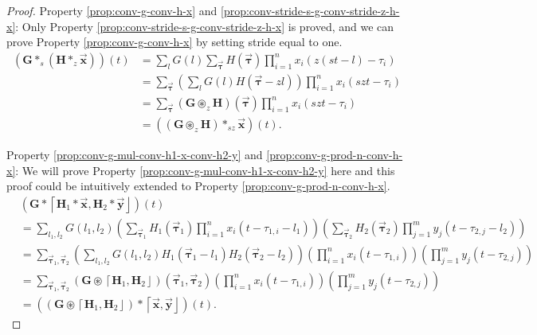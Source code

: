 \documentclass[twoside,11pt]{article}
\def\oconv{\circledast}
\def\tvar#1{\mathbf{#1}} %
\def\vsymb#1{\vec{\mathbf{#1}}}
\def\lcerfl#1{\left\lceil{#1}\right\rfloor}
\begin{document}
\begin{proof}
  Property \ref{prop:conv-g-conv-h-x} and \ref{prop:conv-stride-s-g-conv-stride-z-h-x}: Only Property \ref{prop:conv-stride-s-g-conv-stride-z-h-x} is proved, and we can prove Property \ref{prop:conv-g-conv-h-x} by setting stride equal to one.
  \begin{equation*}
    \begin{aligned}
      \left(\tvar{G} *_s (\tvar{H} *_z \vsymb{x})\right)(t)
       & = \sum_{l} G(l) \sum_{\vsymb{\tau}} H(\vsymb{\tau}) \prod_{i=1}^{n} x_i( z (s t - l) - \tau_i)              \\
       & = \sum_{\vsymb{\tau}} \left( \sum_{l} G(l) H(\vsymb{\tau} - z l) \right) \prod_{i=1}^{n} x_i(sz t - \tau_i) \\
       & = \sum_{\vsymb{\tau}} (\tvar{G} \oconv_z \tvar{H})(\vsymb{\tau}) \prod_{i=1}^{n} x_i(s z t - \tau_i)        \\
       & = \left((\tvar{G} \oconv_z \tvar{H}) *_{sz} \vsymb{x}\right)(t).
    \end{aligned}
  \end{equation*}

  Property \ref{prop:conv-g-mul-conv-h1-x-conv-h2-y} and \ref{prop:conv-g-prod-n-conv-h-x}: %
  We will prove Property \ref{prop:conv-g-mul-conv-h1-x-conv-h2-y} here and this proof could be intuitively extended to Property \ref{prop:conv-g-prod-n-conv-h-x}.
  \begin{equation*}
    \begin{aligned}
       & \left(\tvar{G} * \lcerfl{\tvar{H}_1 * \vsymb{x}, \tvar{H}_2 * \vsymb{y}}\right)(t)                   \\
       & = \sum_{l_1,l_2} G(l_1, l_2)
      \left( \sum_{\vsymb{\tau}_1} H_1(\vsymb{\tau}_1) \prod_{i=1}^{n} x_i(t - \tau_{1,i} - l_1) \right)
      \left( \sum_{\vsymb{\tau}_2} H_2(\vsymb{\tau}_2) \prod_{j=1}^{m} y_j(t - \tau_{2,j} - l_2) \right)      \\
       & = \sum_{\vsymb{\tau}_1, \vsymb{\tau}_2} \left( \sum_{l_1, l_2}
      G(l_1, l_2) H_1(\vsymb{\tau}_1 - l_1) H_2(\vsymb{\tau}_2 - l_2)
      \right)
      \left(\prod_{i=1}^{n} x_i(t - \tau_{1,i})\right) \left(\prod_{j=1}^{m} y_j(t - \tau_{2,j})\right)       \\
       & = \sum_{\vsymb{\tau}_1, \vsymb{\tau}_2}
      (\tvar{G} \oconv \lcerfl{\tvar{H}_1, \tvar{H}_2})(\vsymb{\tau}_1, \vsymb{\tau}_2)
      \left(\prod_{i=1}^{n} x_i(t - \tau_{1,i})\right) \left(\prod_{j=1}^{m} y_j(t - \tau_{2,j})\right)       \\
       & = \left((\tvar{G} \oconv \lcerfl{\tvar{H}_1, \tvar{H}_2}) * \lcerfl{\vsymb{x}, \vsymb{y}}\right)(t).
    \end{aligned}
  \end{equation*}


\end{proof}
\end{document}
